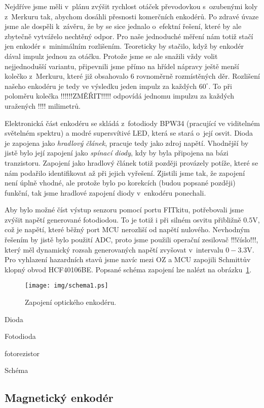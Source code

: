 Nejdříve jsme měli v~plánu zvýšit rychlost otáček převodovkou s~ozubenými koly z~Merkuru tak, abychom dosáhli přesnosti komerčních enkodérů. Po zdravé úvaze jsme ale dospěli k~závěru, že by se sice jednalo o~efektní řešení, které by ale zbytečně vytvářelo nechtěný odpor. Pro naše jednoduché měření nám totiž stačí jen enkodér s~minimálním rozlišením. Teoreticky by stačilo, když by enkodér dával impulz jednou za otáčku. Protože jsme se ale snažili vždy volit nejjednodušší variantu, připevnili jsme přímo na hřídel nápravy ještě menší kolečko z~Merkuru, které již obsahovalo 6 rovnoměrně rozmístěných děr. Rozlišení našeho enkodéru je tedy ve výsledku jeden impulz za každých $60^\circ$. To při poloměru kolečka !!!!!!ZMĚŘIT!!!!! odpovídá jednomu impulzu za každých uražených !!!! milimetrů.

Elektronická část enkodéru se skládá z~fotodiody BPW34 (pracující ve viditelném světelném spektru) a modré supersvítivé LED, která se stará o~její osvit. Dioda je zapojena jako \emph{hradlový článek}, pracuje tedy jako zdroj napětí. Vhodnější by jistě bylo její zapojení jako \emph{spínací diody}, kdy by byla připojena na bázi tranzistoru. Zapojení jako hradlový článek totiž později provázely potíže, které se nám podařilo identifikovat až při jejich vyřešení. Zjistili jsme tak, že zapojení není úplně vhodné, ale protože bylo po korekcích (budou popsané později) funkční, tak jsme hradlové zapojení diody v~enkodéru ponechali.

Aby bylo možné číst výstup senzoru pomocí portu FITkitu, potřebovali jsme zvýšit napětí generované fotodiodou. To je totiž i při silném osvitu přibližně $0.5$V, což je napětí, které běžný port MCU nerozliší od napětí nulového. Nevhodným řešením by jistě bylo použití ADC, proto jsme použili operační zesilovač !!!číslo!!!, který měl dynamický rozsah generovaných napětí zvyšovat v~intervalu $0-3.3$V. Pro vyhlazení hazardních stavů jsme navíc mezi OZ a MCU zapojili Schmittův klopný obvod HCF40106BE. Popsané schéma zapojení lze nalézt na obrázku~\ref{fig:schema1}.

\begin{figure}[h]
\centering
\texttt{[image: img/schema1.ps]}
\caption{Zapojení optického enkodéru.}
\label{fig:schema1}
\end{figure}

Dioda

Fotodioda

fotorezistor

Schéma

\subsection{Magnetický enkodér}

